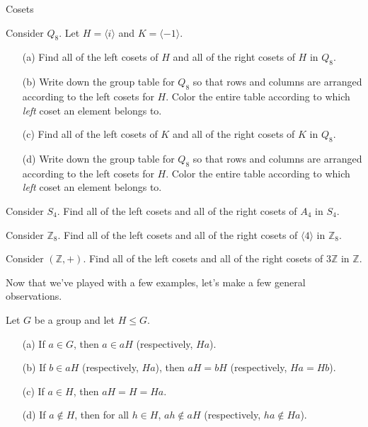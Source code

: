 \begin{section}{Cosets}
\begin{exercise}\label{exer:normal_in_Q8}
Consider \(Q_8\).  Let \(H=\langle i\rangle\) and \(K=\langle -1\rangle\).
\begin{enumerate}
\item[(a)] Find all of the left cosets of \(H\) and all of the right cosets of \(H\) in \(Q_8\).  
\item[(b)] Write down the group table for \(Q_8\) so that rows and columns are arranged according to the left cosets for \(H\).  Color the entire table according to which \emph{left} coset an element belongs to.
\item[(c)] Find all of the left cosets of \(K\) and all of the right cosets of \(K\) in \(Q_8\).
\item[(d)] Write down the group table for \(Q_8\) so that rows and columns are arranged according to the left cosets for \(H\).  Color the entire table according to which \emph{left} coset an element belongs to.
\end{enumerate}
\end{exercise}

\begin{exercise}
Consider \(S_4\).  Find all of the left cosets and all of the right cosets of \(A_4\) in \(S_4\).
\end{exercise}

\begin{exercise}
Consider \(\mathbb{Z}_8\).  Find all of the left cosets and all of the right cosets of \(\langle 4\rangle\) in \(\mathbb{Z}_8\).
\end{exercise}

\begin{exercise}
Consider \((\mathbb{Z},+)\).  Find all of the left cosets and all of the right cosets of \(3\mathbb{Z}\) in \(\mathbb{Z}\).
\end{exercise}

Now that we've played with a few examples, let's make a few general observations.

\begin{theorem}
Let \(G\) be a group and let \(H\leq G\).
\begin{enumerate}
\item[(a)] If \(a\in G\), then \(a\in aH\) (respectively, \(Ha\)).
\item[(b)] \label{thm:coset_representative} If \(b\in aH\) (respectively, \(Ha\)), then \(aH=bH\) (respectively, \(Ha=Hb\)).
\item[(c)] If \(a\in H\), then \(aH=H=Ha\).
\item[(d)] If \(a\notin H\), then for all \(h\in H\), \(ah\notin aH\) (respectively, \(ha \notin Ha\)).
\end{enumerate}
\end{theorem}


\end{section}
